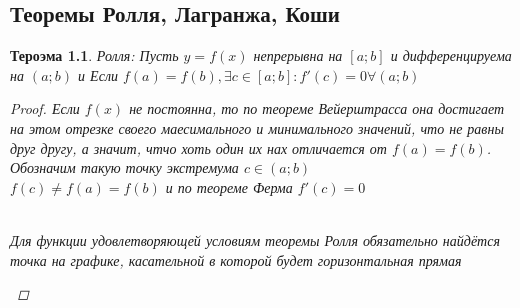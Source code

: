 \documentclass[oneside]{book}
\newtheorem{thm}{Тероэма}[chapter] %
\begin{document}
\begin{enumerate}
\begin{itemize}
\chapter{Теоремы Ролля, Лагранжа, Коши}
\begin{thm}

Ролля: Пусть $y = f(x)$ непрерывна на $[a;b]$ и дифференцируема на $(a;b)$ и Если $f(a) = f(b), \exists c \in [a;b]: f'(c) = 0 \forall (a;b)$

\begin{proof}
  Если $f(x)$ не постоянна, то по теореме Вейерштрасса она достигает на этом отрезке своего маесимального и минимального значений, что не равны друг другу,
  а значит, чтчо хоть один их нах отличается от  $f(a) = f(b)$. Обозначим такую точку экстремума $c \in (a;b)$ \\
  $f(c) \neq f(a) = f(b)$ и по теореме Ферма $f'(c) = 0$
      \begin{center}
            \\
            Для функции удовлетворяющей условиям теоремы Ролля обязательно найдётся точка на графике, касательной в которой будет горизонтальная прямая

\end{center}
\end{proof}
\end{thm}
\end{itemize}
\end{enumerate}
\end{document}
